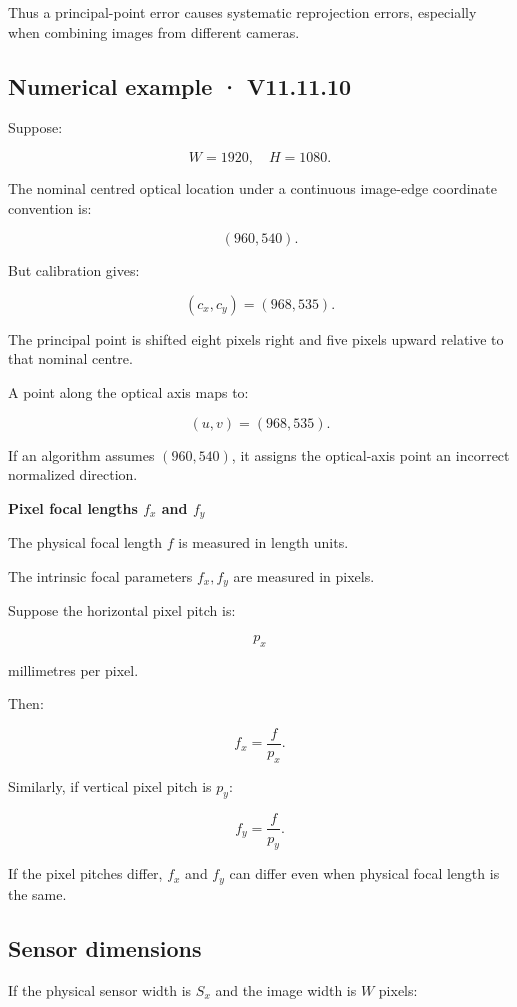 Thus a principal-point error causes systematic reprojection errors, especially when combining images from different cameras.

\subsection{Numerical example · V11.11.10}\label{02-foundations-ii-ch034-numerical-example-v11.11.10}

Suppose:

\[
 W=1920,\quad H=1080.
\]

The nominal centred optical location under a continuous image-edge coordinate convention is:

\[
 (960,540).
\]

But calibration gives:

\[
 (c_x,c_y)=(968,535).
\]

The principal point is shifted eight pixels right and five pixels upward relative to that nominal centre.

A point along the optical axis maps to:

\[
 \boxed{(u,v)=(968,535)}.
\]

If an algorithm assumes \((960,540)\), it assigns the optical-axis point an incorrect normalized direction.

\textbf{Pixel focal lengths \(f_x\) and \(f_y\)}

The physical focal length \(f\) is measured in length units.

The intrinsic focal parameters \(f_x,f_y\) are measured in pixels.

Suppose the horizontal pixel pitch is:

\[
 p_x
\]

millimetres per pixel.

Then:

\[
 \boxed{ f_x=\frac f{p_x} }.
\]

Similarly, if vertical pixel pitch is \(p_y\):

\[
 \boxed{ f_y=\frac f{p_y} }.
\]

If the pixel pitches differ, \(f_x\) and \(f_y\) can differ even when physical focal length is the same.

\subsection{Sensor dimensions}\label{02-foundations-ii-ch034-sensor-dimensions}

If the physical sensor width is \(S_x\) and the image width is \(W\) pixels:

